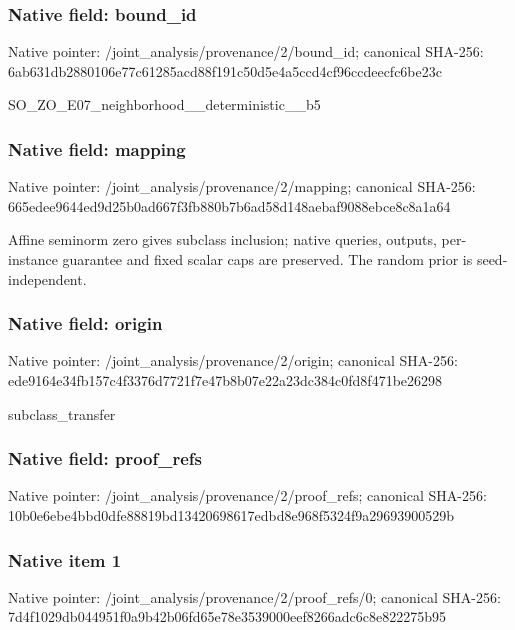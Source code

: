 \documentclass[10pt,a4paper]{article}
\begin{document}
\subsubsection{Native field: bound\_\allowbreak{}id}
Native pointer: /joint\_\allowbreak{}analysis/provenance/2/bound\_\allowbreak{}id; canonical SHA-256: 6ab631db2880106e77c61285acd88f191c50d5e4a5ccd4cf96ccdeecfc6be23c

\begingroup\raggedright\sloppy SO\_\allowbreak{}ZO\_\allowbreak{}E07\_\allowbreak{}neighborhood\_\allowbreak{}\_\allowbreak{}deterministic\_\allowbreak{}\_\allowbreak{}b5\par\endgroup

\subsubsection{Native field: mapping}
Native pointer: /joint\_\allowbreak{}analysis/provenance/2/mapping; canonical SHA-256: 665edee9644ed9d25b0ad667f3fb880b7b6ad58d148aebaf9088ebce8c8a1a64

\begingroup\raggedright\sloppy Affine seminorm zero gives subclass inclusion;\allowbreak{} native queries,\allowbreak{} outputs,\allowbreak{} per-instance guarantee and fixed scalar caps are preserved. The random prior is seed-independent.\par\endgroup

\subsubsection{Native field: origin}
Native pointer: /joint\_\allowbreak{}analysis/provenance/2/origin; canonical SHA-256: ede9164e34fb157c4f3376d7721f7e47b8b07e22a23dc384c0fd8f471be26298

\begingroup\raggedright\sloppy subclass\_\allowbreak{}transfer\par\endgroup

\subsubsection{Native field: proof\_\allowbreak{}refs}
Native pointer: /joint\_\allowbreak{}analysis/provenance/2/proof\_\allowbreak{}refs; canonical SHA-256: 10b0e6ebe4bbd0dfe88819bd13420698617edbd8e968f5324f9a29693900529b

\subsubsection{Native item 1}
Native pointer: /joint\_\allowbreak{}analysis/provenance/2/proof\_\allowbreak{}refs/0; canonical SHA-256: 7d4f1029db044951f0a9b42b06fd65e78e3539000eef8266adc6c8e822275b95
\end{document}
